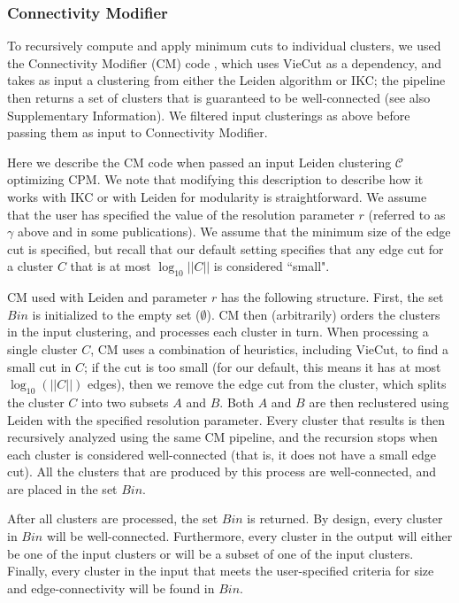 \documentclass[11pt]{article}   	%
\begin{document}
\subsubsection{Connectivity Modifier} To recursively compute and apply minimum cuts to individual clusters, we used the
Connectivity Modifier (CM) code  \citep{cm2022}, which uses VieCut \citep{Henzinger2018,Henzinger2019} as a dependency, and takes as input a clustering from either the Leiden algorithm or IKC; the pipeline then returns a set of clusters that is guaranteed to be well-connected (see also Supplementary Information). We filtered input clusterings as above before passing them as input to Connectivity Modifier.

Here we describe the CM code when passed an input  Leiden clustering $\mathcal{C}$  optimizing CPM. We note that modifying this description to describe how it works with IKC or with Leiden for modularity is straightforward.
We assume that the user has specified the value of the resolution parameter $r$ (referred to as $\gamma$ above and in some publications).
We assume that the minimum size of the edge cut is specified, but recall that our default setting specifies that any edge cut for a cluster $C$ that is at most $ \log _{10} ||C||$ is
considered ``small".

CM used with Leiden and parameter $r$ has the following structure.
First, the set $Bin$ is initialized to the empty set  ($\emptyset$).
CM  then (arbitrarily) orders the clusters in the input clustering, and   processes each cluster in  turn.
When processing a single cluster $C$,
CM uses  a combination of heuristics, including VieCut,  to find a small cut in $C$;  if the cut is too small (for our default, this means it has at most $\log_{10}(||C||)$ edges), then
we remove the edge cut from the cluster, which splits the cluster $C$ into two  subsets $A$ and $B$.
Both $A$ and $B$ are then reclustered using Leiden with the specified resolution parameter.
Every cluster that results is then recursively analyzed using the same CM pipeline, and the recursion stops when each cluster is considered well-connected (that is, it does not have a small edge cut).
All the clusters that are produced by this process are well-connected, and are placed in the set $Bin$.

After all clusters are processed, the set $Bin$ is returned. By design, every cluster in  $Bin$ will be well-connected.
Furthermore, every cluster in the output will either be one of the input clusters or will be a subset of one of the input clusters.
Finally, every cluster in the input that meets the user-specified criteria for size and edge-connectivity will be found in $Bin$.
\end{document}
